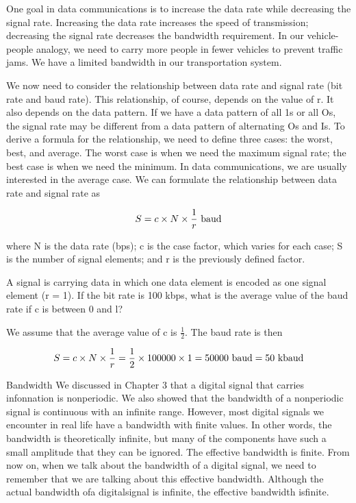 One goal in data communications is to increase the data rate while decreasing the signal rate. Increasing the data rate increases the speed of transmission; decreasing the signal rate decreases the bandwidth requirement. In our vehicle-people analogy, we need to carry more people in fewer vehicles to prevent traffic jams. We have a limited bandwidth in our transportation system.

We now need to consider the relationship between data rate and signal rate (bit rate and baud rate). This relationship, of course, depends on the value of r. It also depends on the data pattern. If we have a data pattern of all 1s or all Os, the signal rate may be different from a data pattern of alternating Os and Is. To derive a formula for the relationship, we need to define three cases: the worst, best, and average. The worst case is when we need the maximum signal rate; the best case is when we need the minimum. In data communications, we are usually interested in the average case. We can formulate the relationship between data rate and signal rate as

\begin{equation}
  S = c \times N \times \frac{1}{r} \textnormal{ baud}
\end{equation}

\noindent where N is the data rate (bps); c is the case factor, which varies for each case; S is the number of signal elements; and r is the previously defined factor.

\vspace{12pt}

\begin{example}
  A signal is carrying data in which one data element is encoded as one signal element (r = 1). If the bit rate is 100 kbps, what is the average value of the baud rate if c is between 0 and l?
\end{example}

\begin{solution}
  We assume that the average value of c is $\frac{1}{2}$. The baud rate is then

  \begin{equation*}
    S = c \times N \times \frac{1}{r} = \frac{1}{2} \times 100000 \times 1 = 50000 \textnormal{ baud} = 50 \textnormal{ kbaud}
  \end{equation*}
\end{solution}

Bandwidth We discussed in Chapter 3 that a digital signal that carries infonnation is nonperiodic. We also showed that the bandwidth of a nonperiodic signal is continuous with an infinite range. However, most digital signals we encounter in real life have a bandwidth with finite values. In other words, the bandwidth is theoretically infinite, but many of the components have such a small amplitude that they can be ignored. The effective bandwidth is finite. From now on, when we talk about the bandwidth of a digital signal, we need to remember that we are talking about this effective bandwidth. Although the actual bandwidth ofa digitalsignal is infinite, the effective bandwidth isfinite.

